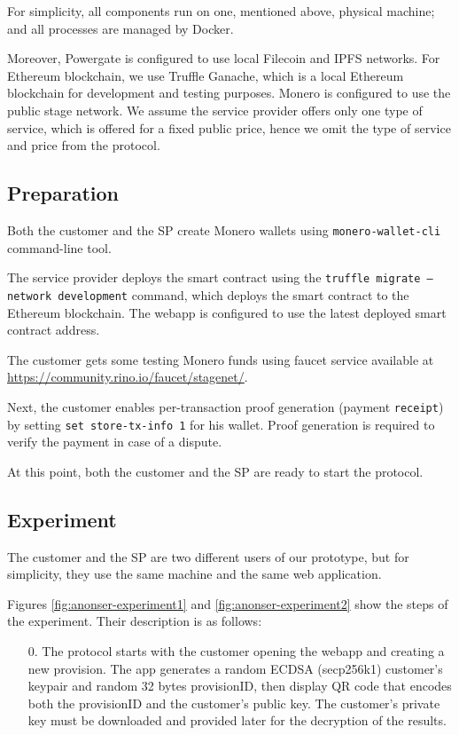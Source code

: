 \documentclass[pdftex,twocolumn,epjc3]{svjour3}
\begin{document}
{For simplicity, all components run on one, mentioned above, physical machine; and all processes are managed by Docker. 

Moreover, Powergate is configured to use local Filecoin and IPFS networks.
For Ethereum blockchain, we use Truffle Ganache, which is a local Ethereum blockchain for development and testing purposes. 
Monero is configured to use the public stage network.
We assume the service provider offers only one type of service, which is offered for a fixed public price, hence we omit the type of service and price from the protocol.

\subsection*{Preparation}

Both the customer and the SP create Monero wallets using \texttt{monero-wallet-cli} command-line tool.

The service provider deploys the smart contract using the \texttt{truffle migrate --network development} command, which deploys the smart contract to the Ethereum blockchain. The webapp is configured to use the latest deployed smart contract address.

The customer gets some testing Monero funds using faucet service available at \url{https://community.rino.io/faucet/stagenet/}.

Next, the customer enables per-transaction proof generation (payment \texttt{receipt}) by setting \texttt{set store-tx-info 1} for his wallet. Proof generation is required to verify the payment in case of a dispute.

At this point, both the customer and the SP are ready to start the protocol.

\subsection*{Experiment}

The customer and the SP are two different users of our prototype, but for simplicity, they use the same machine and the same web application.

Figures \ref{fig:anonser-experiment1} and \ref{fig:anonser-experiment2} show the steps of the experiment. Their description is as follows:

\begin{enumerate}
  \setcounter{enumi}{0}
  \item[0.] The protocol starts with the customer opening the webapp and creating a new provision. 
The app generates a random ECDSA (secp256k1) customer's keypair and random 32 bytes provisionID, then display QR code that encodes both the provisionID and the customer's public key. 
The customer's private key must be downloaded and provided later for the decryption of the results.


\end{enumerate}}
\end{document}

